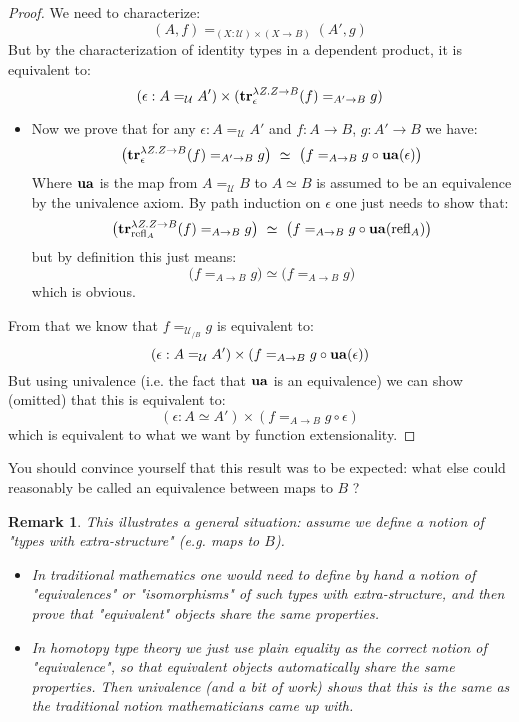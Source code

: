 \documentclass{article}
\newcommand{\U}{{\mathcal U}}
\renewcommand{\r}{\rightarrow}
\newcommand{\Gl}{\lambda}
\newcommand{\refl}{\mathrm{refl}}
\newcommand{\tr}{\mathrm{\bf tr}}
\newcommand{\ua}{\mathrm{\bf ua}}
\newtheorem{remark}{Remark}
\begin{document}
\begin{proof}
We need to characterize:
\[(A,f)=_{(X:\U)\times (X\r B)} (A',g)\]
But by the characterization of identity types in a dependent product, it is equivalent to:
\[(\epsilon : A=_\U A')\times (\tr^{\Gl Z.Z\r B}_\epsilon(f) =_{A'\r B} g)\]

\begin{itemize}

\item Now we prove that for any $\epsilon:A=_\U A'$ and $f:A\r B$, $g:A'\r B$ we have:
\[\big(\tr^{\Gl Z.Z\r B}_\epsilon(f) =_{A'\r B} g\big) \ \simeq\ \big(f =_{A\r B}g\circ \ua(\epsilon) \big)\]
Where $\ua$ is the map from $A=_\U B$ to $A\simeq B$ is assumed to be an equivalence by the univalence axiom.
By path induction on $\epsilon$ one just needs to show that:
\[\big(\tr^{\Gl Z.Z\r B}_{\refl_A}(f) =_{A\r B} g\big) \ \simeq\ \big(f =_{A\r B}g\circ \ua(\refl_A)\big) \]
but by definition this just means:
\[\big(f=_{A\r B}g\big) \simeq \big(f =_{A\r B} g\big)\]
which is obvious.
\end{itemize}

From that we know that $f=_{\U_{/B}} g$ is equivalent to:
\[(\epsilon : A=_\U A')\times (f=_{A\r B} g\circ \ua(\epsilon))\]
But using univalence (i.e. the fact that $\ua$ is an equivalence) we can show (omitted) that this is equivalent to:
\[(\epsilon:A\simeq A')\times (f=_{A\r B} g \circ \epsilon)\]
which is equivalent to what we want by function extensionality.

\end{proof}

You should convince yourself that this result was to be expected: what else could reasonably be called an equivalence between maps to $B$ ?

\begin{remark}
This illustrates a general situation: assume we define a notion of "types with extra-structure" (e.g. maps to $B$). 
\begin{itemize}
\item In traditional mathematics one would need to define by hand a notion of "equivalences" or "isomorphisms" of such types with extra-structure, and then prove that "equivalent" objects share the same properties. 
\item In homotopy type theory we just use plain equality as the correct notion of "equivalence", so that equivalent objects automatically share the same properties. Then univalence (and a bit of work) shows that this is the same as the traditional notion mathematicians came up with.%
\end{itemize}
\end{remark}
\end{document}

